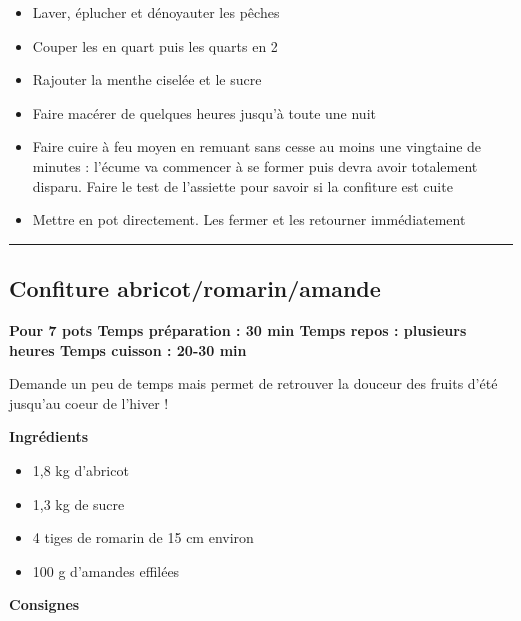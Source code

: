 \documentclass[]{book}
\providecommand{\tightlist}{%
  \setlength{\itemsep}{0pt}\setlength{\parskip}{0pt}}
\begin{document}
\begin{itemize}
\tightlist
\item
  Laver, éplucher et dénoyauter les pêches
\item
  Couper les en quart puis les quarts en 2
\item
  Rajouter la menthe ciselée et le sucre
\item
  Faire macérer de quelques heures jusqu'à toute une nuit
\item
  Faire cuire à feu moyen en remuant sans cesse au moins une vingtaine
  de minutes : l'écume va commencer à se former puis devra avoir
  totalement disparu. Faire le test de l'assiette pour savoir si la
  confiture est cuite
\item
  Mettre en pot directement. Les fermer et les retourner immédiatement
\end{itemize}

\begin{center}\rule{0.5\linewidth}{0.5pt}\end{center}

\subsection*{\texorpdfstring{{Confiture
abricot/romarin/amande}}{Confiture abricot/romarin/amande}}\label{confiture-abricotromarinamande}

\begin{sucrebox}
\textbf{Pour 7 pots \textbar{} Temps préparation : 30 min \textbar{}
Temps repos : plusieurs heures\textbar{} Temps cuisson : 20-30 min}

Demande un peu de temps mais permet de retrouver la douceur des fruits
d'été jusqu'au coeur de l'hiver !
\end{sucrebox}

\textbf{Ingrédients}

\begin{itemize}
\tightlist
\item
  1,8 kg d'abricot
\item
  1,3 kg de sucre
\item
  4 tiges de romarin de 15 cm environ
\item
  100 g d'amandes effilées
\end{itemize}

\textbf{Consignes}
\end{document}
